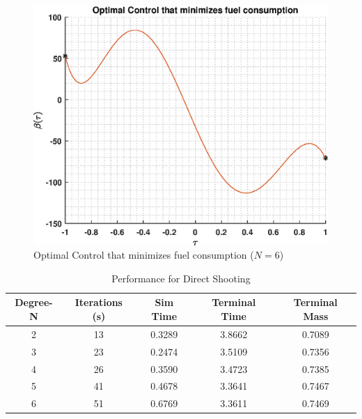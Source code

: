 \documentclass[]{article}
\begin{document}
\begin{figure}
	\centering
	\includegraphics[scale=0.75]{directControlPoly6.eps}
	\caption{Optimal Control that minimizes fuel consumption (\(N = 6\))}
	\label{fig:directControlPoly6}
\end{figure}
\begin{table}
	\centering
	\begin{tabular}{||c c c c c||} 
		\hline
		Degree-N & Iterations (s) & Sim Time & Terminal Time & Terminal Mass\\ [0.5ex] 
		\hline\hline
		2           & 13            & 0.3289     &  3.8662     & 0.7089\\
		\hline
		3           & 23            & 0.2474     &  3.5109     & 0.7356\\ 
		\hline
		4           & 26            & 0.3590     &  3.4723     & 0.7385\\ 
		\hline
		5           & 41            & 0.4678     &  3.3641     & 0.7467\\ 
		\hline
		6           & 51            & 0.6769     &  3.3611     & 0.7469\\ [1ex]
		\hline
	\end{tabular}
	\caption{Performance for Direct Shooting}
	\label{table:3}
\end{table}
\end{document}
